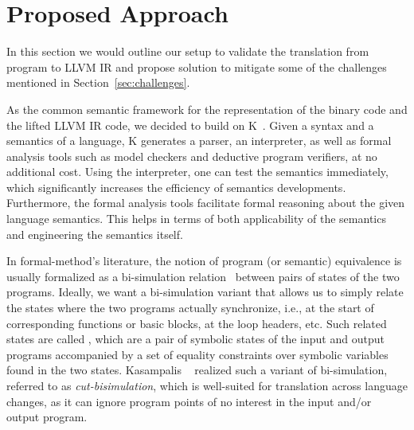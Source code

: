 \section{Proposed Approach}\label{sec:approach} In this section we would
outline our setup to validate the translation from \ISA program to LLVM IR and
propose solution to mitigate some of the challenges mentioned in
Section~\ref{sec:challenges}.


As the common semantic framework for the representation of the binary code and
the lifted LLVM IR code, we decided to build on K~\cite{k-primer-2013-v32}.
        Given a syntax and a semantics of a language, K generates a parser, an
        interpreter, as well as formal analysis tools such as model checkers
        and deductive program verifiers, at no additional cost.  Using the
        interpreter, one can test the semantics immediately, which
        significantly increases the efficiency of semantics developments.
        Furthermore, the formal analysis tools facilitate formal reasoning
        about the given language semantics. This helps in terms of both
        applicability of the semantics and engineering the semantics itself.
    

In formal-method's literature, the notion of program (or semantic) equivalence
is usually formalized as a bi-simulation relation~\cite{Sangiorgi:2011} between
pairs of states of the two programs.
Ideally, we want a bi-simulation variant that allows us to simply relate the
states where the two programs actually synchronize, i.e., at the start of
corresponding functions or basic blocks, at the loop headers, etc. Such related states are called \syncps, which are a pair of symbolic states of the input and output programs accompanied by a set of equality constraints over symbolic variables found in the two states. Kasampalis \etal~\cite{TheoSAS19} realized such a variant of bi-simulation, referred to as  \emph{cut-bisimulation}, which is  well-suited for translation  across
language changes, as it can ignore program points of no interest in the input
and/or output program.
%

